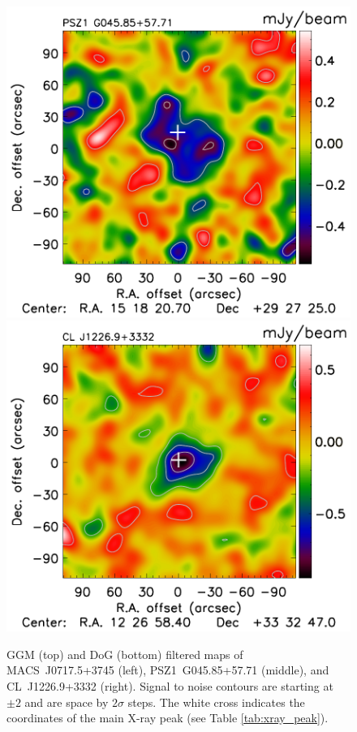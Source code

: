 \documentclass[twocolumn,traditabstract]{aa}
\begin{document}
\begin{figure}[h]
\includegraphics[trim=0cm 0cm 0cm 0cm, clip=true, totalheight=3.8cm]{Figure/DoG_PSZ1G045_15_15_45.pdf}
\includegraphics[trim=0cm 0cm 0cm 0cm, clip=true, totalheight=3.8cm]{Figure/DoG_CLJ1227_15_15_45.pdf}
\caption{\footnotesize{GGM (top) and DoG (bottom) filtered maps of \mbox{MACS~J0717.5+3745} (left), \mbox{PSZ1~G045.85+57.71} (middle), and \mbox{CL~J1226.9+3332} (right). Signal to noise contours are starting at $\pm 2$ and are space by $2 \sigma$ steps. The white cross indicates the coordinates of the main X-ray peak (see Table \ref{tab:xray_peak}).}}
\label{fig:filtered_NIKA_maps}
\end{figure}
\end{document}
